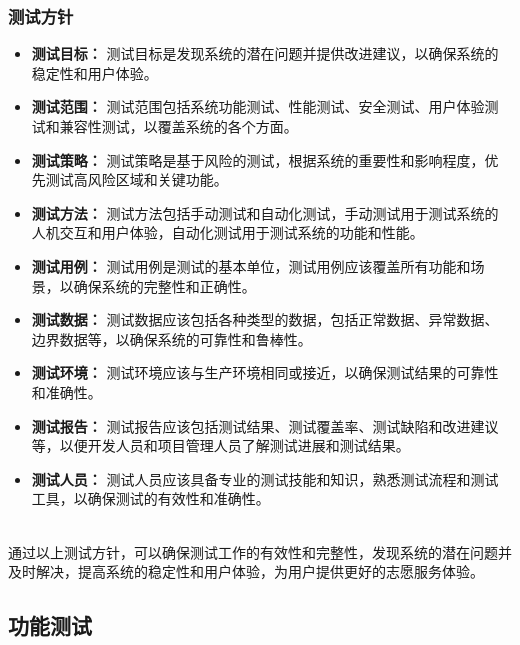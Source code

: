 \subsubsection{测试方针}
\begin{itemize}[itemsep=2pt,topsep=0pt,parsep=4pt,itemindent=1em]
    \item \textbf{测试目标：} 测试目标是发现系统的潜在问题并提供改进建议，以确保系统的稳定性和用户体验。
    \item \textbf{测试范围：} 测试范围包括系统功能测试、性能测试、安全测试、用户体验测试和兼容性测试，以覆盖系统的各个方面。
    \item \textbf{测试策略：} 测试策略是基于风险的测试，根据系统的重要性和影响程度，优先测试高风险区域和关键功能。
    \item \textbf{测试方法：} 测试方法包括手动测试和自动化测试，手动测试用于测试系统的人机交互和用户体验，自动化测试用于测试系统的功能和性能。
    \item \textbf{测试用例：} 测试用例是测试的基本单位，测试用例应该覆盖所有功能和场景，以确保系统的完整性和正确性。
    \item \textbf{测试数据：} 测试数据应该包括各种类型的数据，包括正常数据、异常数据、边界数据等，以确保系统的可靠性和鲁棒性。
    \item \textbf{测试环境：} 测试环境应该与生产环境相同或接近，以确保测试结果的可靠性和准确性。
    \item \textbf{测试报告：} 测试报告应该包括测试结果、测试覆盖率、测试缺陷和改进建议等，以便开发人员和项目管理人员了解测试进展和测试结果。
    \item \textbf{测试人员：} 测试人员应该具备专业的测试技能和知识，熟悉测试流程和测试工具，以确保测试的有效性和准确性。
\end{itemize}

\\

通过以上测试方针，可以确保测试工作的有效性和完整性，发现系统的潜在问题并及时解决，提高系统的稳定性和用户体验，为用户提供更好的志愿服务体验。
\subsection{功能测试}
